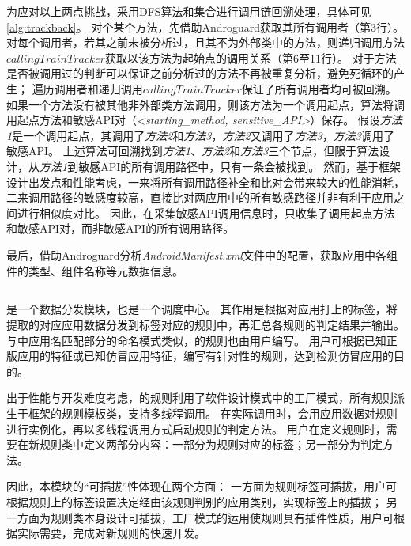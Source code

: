 为应对以上两点挑战，\componentB 采用DFS算法和集合进行调用链回溯处理，具体可见\autoref{alg:trackback}。
对个某个方法，\componentB 先借助Androguard获取其所有调用者（第3行）。
对每个调用者，若其之前未被分析过，且其不为外部类中的方法，则递归调用方法$callingTrainTracker$获取以该方法为起始点的调用关系（第6至11行）。
对于方法是否被调用过的判断可以保证之前分析过的方法不再被重复分析，避免死循环的产生；
遍历调用者和递归调用$callingTrainTracker$保证了所有调用者均可被回溯。
如果一个方法没有被其他非外部类方法调用，则该方法为一个调用起点，算法将调用起点方法和敏感API对（\textit{<starting\_method, sensitive\_API>}）保存。
假设\textit{方法1}是一个调用起点，其调用了\textit{方法2}和\textit{方法3}，\textit{方法2}又调用了\textit{方法3}，\textit{方法3}调用了敏感API。
上述算法可回溯找到\textit{方法1}、\textit{方法2}和\textit{方法3}三个节点，但限于算法设计，从\textit{方法1}到敏感API的所有调用路径中，只有一条会被找到。
然而，基于框架设计出发点和性能考虑，一来将所有调用路径补全和比对会带来较大的性能消耗，二来调用路径的敏感度较高，直接比对两应用中的所有敏感路径并非有利于应用之间进行相似度对比。
因此，\componentB 在采集敏感API调用信息时，只收集了调用起点方法和敏感API对，而非敏感API的所有调用路径。

最后，\componentB 借助Androguard分析\textit{AndroidManifest.xml}文件中的配置，获取应用中各组件的类型、组件名称等元数据信息。

\subsection{\componentC }
\componentC 是一个数据分发模块，也是一个调度中心。
其作用是根据\componentA 对应用打上的标签，将\componentB 提取的对应应用数据分发到标签对应的规则中，再汇总各规则的判定结果并输出。
与\componentA 中应用名匹配部分的命名模式类似，\componentC 的规则也由用户编写。
用户可根据已知正版应用的特征或已知仿冒应用特征，编写有针对性的规则，达到检测仿冒应用的目的。

出于性能与开发难度考虑，\componentC 的规则利用了软件设计模式中的工厂模式，所有规则派生于框架的规则模板类，支持多线程调用。
在实际调用时，\componentC 会用应用数据对规则进行实例化，再以多线程调用方式启动规则的判定方法。
用户在定义规则时，需要在新规则类中定义两部分内容：一部分为规则对应的标签；另一部分为判定方法。

因此，本模块的``可插拔''性体现在两个方面：
一方面为规则标签可插拔，用户可根据规则上的标签设置决定经由该规则判别的应用类别，实现标签上的插拔；
另一方面为规则类本身设计可插拔，工厂模式的运用使规则具有插件性质，用户可根据实际需要，完成对新规则的快速开发。


